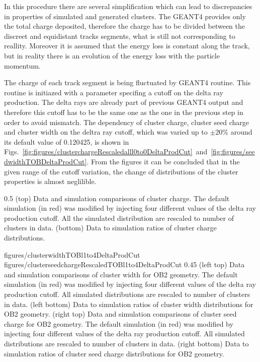 In this procedure there are several simplification which can lead to discrepancies in properties of simulated and generated clusters. The GEANT4 provides only the total charge deposited, therefore the charge has to be divided between the discreet and equidistant tracks segments, what is still not corresponding to reallity. Moreover it is assumed that the energy loss is constant along the track, but in reality there is an evolution of the energy loss with the particle momentum.

The charge of each track segment is being fluctuated by GEANT4 routine. This routine is initiazed with a parameter specifing a cutoff on the delta ray production. The delta rays are already part of previous GEANT4 output and therefore this cutoff has to be the same one as the one in the previous step in order to avoid mismatch. The dependency of cluster charge, cluster seed charge and cluster width on the deltra ray cutoff, which was varied up to $\pm 20\%$ around its default value of 0.120425, is shown in Figs.~\ref{fig:figures/clusterchargeRescaledalll0to0DeltaProdCut}~and~\ref{fig:figures/seedwidthTOBDeltaProdCut}. From the figures it can be concluded that in the given range of the cutoff variation, the change of distributions of the cluster properties is almost neglilible. 

                 {0.5}       %
                 { (top) Data and simulation comparisons of cluster charge. The default simulation (in red) was modified by injecting four different values of the delta ray production cutoff. All the simulated distribution are rescaled to number of clusters in data. (bottom) Data to simulation ratios of cluster charge distributions. }

                 {figures/clusterwidthTOBl1to4DeltaProdCut}
                 {figures/clusterseedchargeRescaledTOBl1to4DeltaProdCut} %
                 {0.45}       %
                 {(left top) Data and simulation  comparisons of cluster width for OB2 geometry. The default simulation (in red) was modified by injecting four different values of the delta ray production cutoff. All simulated distributions are rescaled to number of clusters in data. (left bottom) Data to simulation ratios of cluster width distributions for OB2 geometry. (right top) Data and simulation  comparisons of cluster seed charge for OB2 geometry. The default simulation (in red) was modified by injecting four different values of the delta ray production cutoff. All simulated distributions are rescaled to number of clusters in data. (right bottom) Data to simulation ratios of cluster seed charge distributions for OB2 geometry. }


